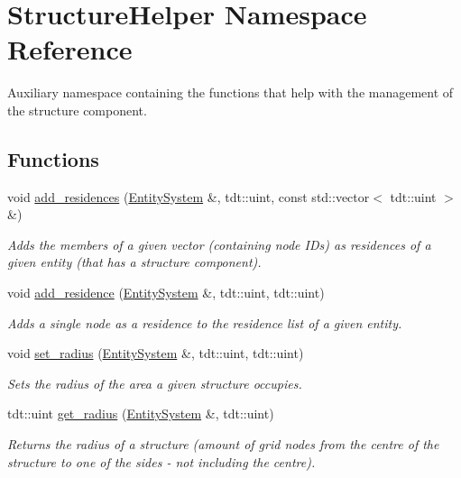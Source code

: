 \hypertarget{namespace_structure_helper}{}\section{Structure\+Helper Namespace Reference}
\label{namespace_structure_helper}


Auxiliary namespace containing the functions that help with the management of the structure component.  


\subsection*{Functions}
\begin{DoxyCompactItemize}
\item 
void \hyperlink{namespace_structure_helper_a29babcdb58f58e5fd14fbae255cb53f1}{add\+\_\+residences} (\hyperlink{class_entity_system}{Entity\+System} \&, tdt\+::uint, const std\+::vector$<$ tdt\+::uint $>$ \&)
\begin{DoxyCompactList}\small\item\em Adds the members of a given vector (containing node I\+Ds) as residences of a given entity (that has a structure component). \end{DoxyCompactList}\item 
void \hyperlink{namespace_structure_helper_a924a6f654ea8afebbcb83bbfd3af30a1}{add\+\_\+residence} (\hyperlink{class_entity_system}{Entity\+System} \&, tdt\+::uint, tdt\+::uint)
\begin{DoxyCompactList}\small\item\em Adds a single node as a residence to the residence list of a given entity. \end{DoxyCompactList}\item 
void \hyperlink{namespace_structure_helper_ab3acfb0dbeda0b16b5f2fcb3e548eee6}{set\+\_\+radius} (\hyperlink{class_entity_system}{Entity\+System} \&, tdt\+::uint, tdt\+::uint)
\begin{DoxyCompactList}\small\item\em Sets the radius of the area a given structure occupies. \end{DoxyCompactList}\item 
tdt\+::uint \hyperlink{namespace_structure_helper_a0317c12cf1560dcf490857e6f1a10688}{get\+\_\+radius} (\hyperlink{class_entity_system}{Entity\+System} \&, tdt\+::uint)
\begin{DoxyCompactList}\small\item\em Returns the radius of a structure (amount of grid nodes from the centre of the structure to one of the sides -\/ not including the centre). \end{DoxyCompactList}\item 

\end{DoxyCompactItemize}

